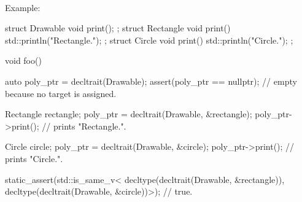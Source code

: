 \documentclass{article}
\begin{document}
\paragraph{} Example:
\begin{codeblock}
struct Drawable { void print(); };
struct Rectangle { void print() { std::println("Rectangle."); } };
struct Circle { void print() { std::println("Circle."); } };

void foo() {
  auto poly_ptr = decltrait(Drawable);
  assert(poly_ptr == nullptr); // empty because no target is assigned.

  Rectangle rectangle;
  poly_ptr = decltrait(Drawable, &rectangle);
  poly_ptr->print(); // prints "Rectangle.".

  Circle circle;
  poly_ptr = decltrait(Drawable, &circle);
  poly_ptr->print(); // prints "Circle.".

  static_assert(std::is_same_v<
    decltype(decltrait(Drawable, &rectangle)),
    decltype(decltrait(Drawable, &circle))>); // true.
}
\end{codeblock}
\end{document}

